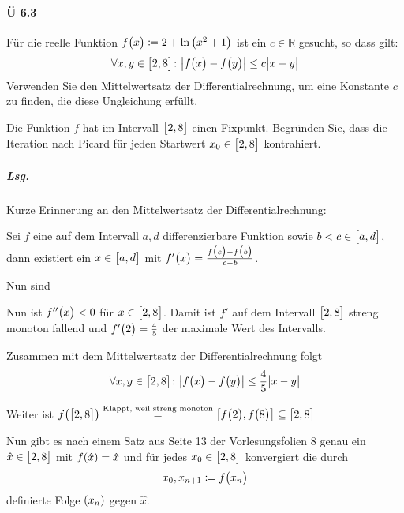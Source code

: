\documentclass{scrreprt}
\begin{document}
\paragraph{Ü 6.3} Für die reelle Funktion
$f\qty\big(x) \coloneqq 2 + \ln\qty(x^2 + 1)$ ist ein $c \in \mathbb{R}$
gesucht, so dass gilt:
\[
  \forall x, y \in \qty\big[2, 8] \colon \abs{f\qty\big(x) - f\qty\big(y)} \leq c \abs\big{x - y}
\]
Verwenden Sie den Mittelwertsatz der Differentialrechnung, um eine Konstante $c$
zu finden, die diese Ungleichung erfüllt.

Die Funktion $f$ hat im Intervall $\qty\big[2, 8]$ einen Fixpunkt.
Begründen Sie, dass die Iteration nach Picard für jeden Startwert
$x_0 \in \qty\big[2, 8]$ kontrahiert.

\subparagraph{Lsg.} Kurze Erinnerung an den Mittelwertsatz der
Differentialrechnung:

Sei $f$ eine auf dem Intervall $a, d$ differenzierbare Funktion sowie
$b < c \in \qty\big[a, d]$, dann existiert ein $x \in \qty\big[a, d]$ mit
$f'\qty\big(x) = \frac{f\qty\big(c) - f\qty\big(b)}{c - b}$.

Nun sind
Nun ist $f''\qty\big(x) < 0$ für $x \in \qty\big[2, 8]$.
Damit ist $f'$ auf dem Intervall $\qty\big[2, 8]$ streng monoton fallend und
$f'\qty\big(2) = \frac{4}{5}$ der maximale Wert des Intervalls.

Zusammen mit dem Mittelwertsatz der Differentialrechnung folgt
\[
  \forall x, y \in \qty\big[2, 8] \colon \abs{f\qty\big(x) - f\qty\big(y)} \leq \frac{4}{5} \abs\big{x - y}
\]

Weiter ist $f\qty(\qty\big[2, 8]) \overset{\text{Klappt, weil streng monoton}}= \qty[f\qty\big(2), f\qty\big(8)] \subseteq \qty\big[2, 8]$

Nun gibt es nach einem Satz aus Seite 13 der Vorlesungsfolien 8 genau ein
$\hat{x} \in \qty\big[2, 8]$ mit $f\qty(\hat{x}) = \hat{x}$ und für jedes
$x_0 \in \qty\big[2, 8]$ konvergiert die durch
\[
  x_0, x_{n + 1} \coloneqq f\qty\big(x_n)
\]
definierte Folge $\qty(x_n)$ gegen $\hat{x}$.
\end{document}
